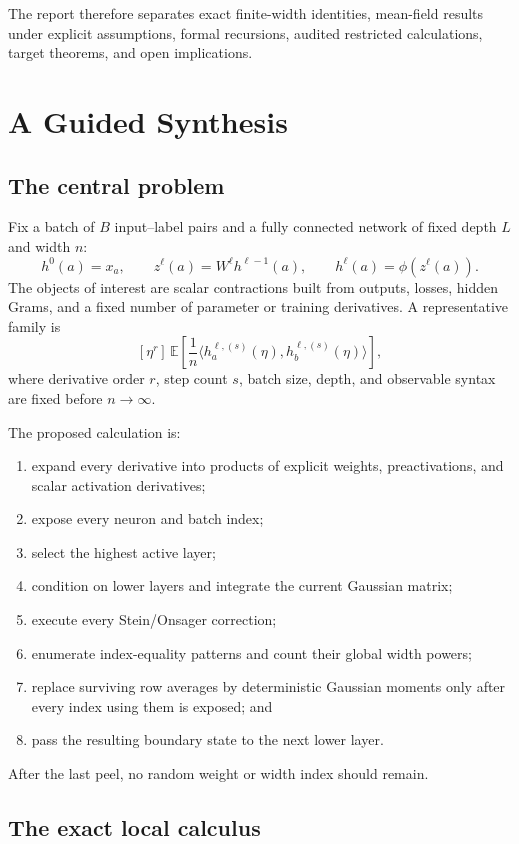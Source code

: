 \documentclass[11pt,oneside]{report}
\begin{document}
The report therefore separates exact finite-width identities, mean-field
results under explicit assumptions, formal recursions, audited restricted
calculations, target theorems, and open implications.

\clearpage
{}

\part{A Guided Synthesis}

\chapter{The central problem}

Fix a batch of $B$ input--label pairs and a fully connected network of fixed
depth $L$ and width $n$:
\[
h^0(a)=x_a,\qquad
z^\ell(a)=W^\ell h^{\ell-1}(a),\qquad
h^\ell(a)=\phi(z^\ell(a)).
\]
The objects of interest are scalar contractions built from outputs, losses,
hidden Grams, and a fixed number of parameter or training derivatives.  A
representative family is
\[
[\eta^r]\,
\mathbb E\!\left[
\frac1n\langle h^{\ell,(s)}_a(\eta),
h^{\ell,(s)}_b(\eta)\rangle
\right],
\]
where derivative order $r$, step count $s$, batch size, depth, and observable
syntax are fixed before $n\to\infty$.

The proposed calculation is:
\begin{enumerate}
\item expand every derivative into products of explicit weights,
preactivations, and scalar activation derivatives;
\item expose every neuron and batch index;
\item select the highest active layer;
\item condition on lower layers and integrate the current Gaussian matrix;
\item execute every Stein/Onsager correction;
\item enumerate index-equality patterns and count their global width powers;
\item replace surviving row averages by deterministic Gaussian moments only
after every index using them is exposed; and
\item pass the resulting boundary state to the next lower layer.
\end{enumerate}
After the last peel, no random weight or width index should remain.

\chapter{The exact local calculus}
\end{document}
